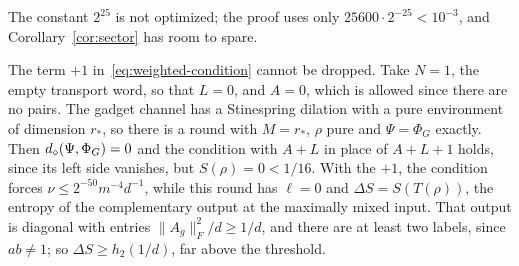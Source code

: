 The constant $2^{25}$ is not optimized; the proof uses only $25600\cdot2^{-25}<10^{-3}$, and Corollary~\ref{cor:sector} has room to spare.

\begin{remark}\label{rem:plus-one}
The term $+1$ in~\eqref{eq:weighted-condition} cannot be dropped. Take $N=1$, the empty transport word, so that $L=0$, and $A=0$, which is
allowed since there are no pairs. The gadget channel has a Stinespring dilation with a pure environment of dimension $r_*$, so there is a round
with $M=r_*$, $\rho$ pure and $\Psi=\Phi_G$ exactly. Then $d_\diamond(\Psi,\Phi_G)=0$ and the condition with $A+L$ in place of $A+L+1$ holds, since its left
side vanishes, but $S(\rho)=0<1/16$. With the $+1$, the condition forces $\nu\le2^{-50}m^{-4}d^{-1}$, while this round has $\ell=0$ and
$\Delta S=S(T(\rho))$, the entropy of the complementary output at the maximally mixed input. That output is diagonal with entries
$\|A_g\|_F^2/d\ge1/d$, and there are at least two labels, since $ab\ne1$; so $\Delta S\ge h_2(1/d)$, far above the threshold.
\end{remark}
